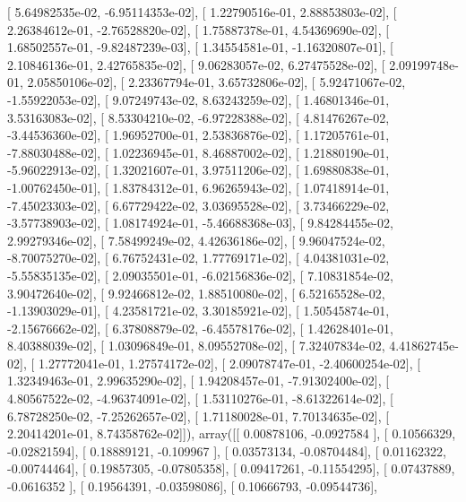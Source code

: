 \documentclass{article}
\begin{document}
       [  5.64982535e-02,  -6.95114353e-02],
       [  1.22790516e-01,   2.88853803e-02],
       [  2.26384612e-01,  -2.76528820e-02],
       [  1.75887378e-01,   4.54369690e-02],
       [  1.68502557e-01,  -9.82487239e-03],
       [  1.34554581e-01,  -1.16320807e-01],
       [  2.10846136e-01,   2.42765835e-02],
       [  9.06283057e-02,   6.27475528e-02],
       [  2.09199748e-01,   2.05850106e-02],
       [  2.23367794e-01,   3.65732806e-02],
       [  5.92471067e-02,  -1.55922053e-02],
       [  9.07249743e-02,   8.63243259e-02],
       [  1.46801346e-01,   3.53163083e-02],
       [  8.53304210e-02,  -6.97228388e-02],
       [  4.81476267e-02,  -3.44536360e-02],
       [  1.96952700e-01,   2.53836876e-02],
       [  1.17205761e-01,  -7.88030488e-02],
       [  1.02236945e-01,   8.46887002e-02],
       [  1.21880190e-01,  -5.96022913e-02],
       [  1.32021607e-01,   3.97511206e-02],
       [  1.69880838e-01,  -1.00762450e-01],
       [  1.83784312e-01,   6.96265943e-02],
       [  1.07418914e-01,  -7.45023303e-02],
       [  6.67729422e-02,   3.03695528e-02],
       [  3.73466229e-02,  -3.57738903e-02],
       [  1.08174924e-01,  -5.46688368e-03],
       [  9.84284455e-02,   2.99279346e-02],
       [  7.58499249e-02,   4.42636186e-02],
       [  9.96047524e-02,  -8.70075270e-02],
       [  6.76752431e-02,   1.77769171e-02],
       [  4.04381031e-02,  -5.55835135e-02],
       [  2.09035501e-01,  -6.02156836e-02],
       [  7.10831854e-02,   3.90472640e-02],
       [  9.92466812e-02,   1.88510080e-02],
       [  6.52165528e-02,  -1.13903029e-01],
       [  4.23581721e-02,   3.30185921e-02],
       [  1.50545874e-01,  -2.15676662e-02],
       [  6.37808879e-02,  -6.45578176e-02],
       [  1.42628401e-01,   8.40388039e-02],
       [  1.03096849e-01,   8.09552708e-02],
       [  7.32407834e-02,   4.41862745e-02],
       [  1.27772041e-01,   1.27574172e-02],
       [  2.09078747e-01,  -2.40600254e-02],
       [  1.32349463e-01,   2.99635290e-02],
       [  1.94208457e-01,  -7.91302400e-02],
       [  4.80567522e-02,  -4.96374091e-02],
       [  1.53110276e-01,  -8.61322614e-02],
       [  6.78728250e-02,  -7.25262657e-02],
       [  1.71180028e-01,   7.70134635e-02],
       [  2.20414201e-01,   8.74358762e-02]]), array([[ 0.00878106, -0.0927584 ],
       [ 0.10566329, -0.02821594],
       [ 0.18889121, -0.109967  ],
       [ 0.03573134, -0.08704484],
       [ 0.01162322, -0.00744464],
       [ 0.19857305, -0.07805358],
       [ 0.09417261, -0.11554295],
       [ 0.07437889, -0.0616352 ],
       [ 0.19564391, -0.03598086],
       [ 0.10666793, -0.09544736],
\end{document}
